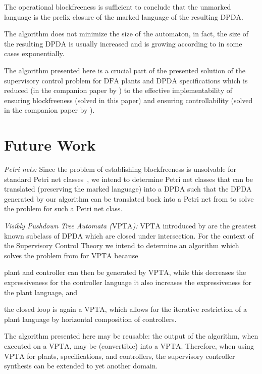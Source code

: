 \documentclass[draft]{ifacconf}
\newcommand{\DFA}{\ensuremath{\mathrm{DFA}}\xspace}
\newcommand{\DPDA}{\ensuremath{\mathrm{DPDA}}\xspace}
\newcommand{\VPTA}{\ensuremath{\mathrm{VPTA}}\xspace}
\newcommand{\myparagraph}[1]{\par\emph{#1:}}
\begin{document}
The operational blockfreeness is sufficient to conclude that the unmarked language is the prefix closure of the marked language of the resulting \DPDA.

The algorithm does not minimize the size of the automaton, in fact, the size of the resulting \DPDA is usually increased and is growing according to \cite{DBLP:conf/focs/GellerHSU75} in some cases exponentially.

The algorithm presented here is a crucial part of the presented solution of the supervisory control problem for \DFA plants and \DPDA specifications which is reduced (in the companion paper by \citet*{SchneiderSchmuck2014}) to the effective implementability of ensuring blockfreeness (solved in this paper) and ensuring controllability (solved in the companion paper by \citet*{SchmuckSchneider2014}).

\section{Future Work}\label{sect:FUTURE}
\myparagraph{Petri nets}
Since the problem of establishing blockfreeness is unsolvable for standard Petri net classes~\citep{GiuaCesare1994,GiuaCesare1995}, we intend to determine Petri net classes  that can be translated (preserving the marked language) into a \DPDA  such that the \DPDA generated by our algorithm  can be translated back into a Petri net from  to solve the problem for such a Petri net class.

\myparagraph{Visibly Pushdown Tree Automata (\VPTA)}
\VPTA introduced by \cite{DBLP:conf/frocos/ChabinR07} are the greatest known subclass of \DPDA which are closed under intersection.
For the context of the Supervisory Control Theory we intend to determine an algorithm which solves the problem from  for \VPTA because
\begin{inparaenum}[(i)]
\item plant and controller can then be generated by \VPTA, while this decreases the expressiveness for the controller language it also increases the expressiveness for the plant language, and
\item the closed loop is again a \VPTA, which allows for the iterative restriction of a plant language by horizontal composition of controllers.
\end{inparaenum}
The algorithm presented here may be reusable: the output of the algorithm, when executed on a \VPTA, may be (convertible) into a \VPTA.
Therefore, when using \VPTA for plants, specifications, and controllers, the supervisory controller synthesis can be extended to yet another domain.
\end{document}
